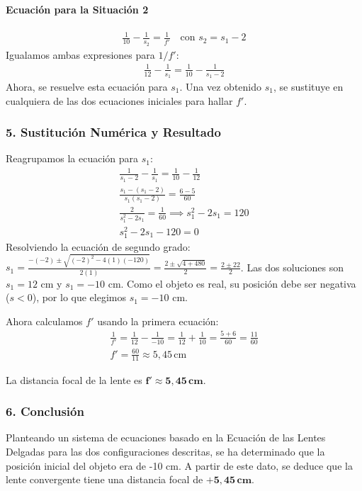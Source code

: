 \paragraph*{Ecuación para la Situación 2}
\begin{gather}
    \frac{1}{10} - \frac{1}{s_2} = \frac{1}{f'} \quad \text{con } s_2 = s_1 - 2
\end{gather}
Igualamos ambas expresiones para $1/f'$:
\begin{gather}
    \frac{1}{12} - \frac{1}{s_1} = \frac{1}{10} - \frac{1}{s_1 - 2}
\end{gather}
Ahora, se resuelve esta ecuación para $s_1$. Una vez obtenido $s_1$, se sustituye en cualquiera de las dos ecuaciones iniciales para hallar $f'$.

\subsubsection*{5. Sustitución Numérica y Resultado}
Reagrupamos la ecuación para $s_1$:
\begin{gather}
    \frac{1}{s_1 - 2} - \frac{1}{s_1} = \frac{1}{10} - \frac{1}{12} \nonumber \\[8pt]
    \frac{s_1 - (s_1 - 2)}{s_1(s_1 - 2)} = \frac{6 - 5}{60} \nonumber \\[8pt]
    \frac{2}{s_1^2 - 2s_1} = \frac{1}{60} \implies s_1^2 - 2s_1 = 120 \nonumber \\[8pt]
    s_1^2 - 2s_1 - 120 = 0
\end{gather}
Resolviendo la ecuación de segundo grado:
$s_1 = \frac{-(-2) \pm \sqrt{(-2)^2 - 4(1)(-120)}}{2(1)} = \frac{2 \pm \sqrt{4 + 480}}{2} = \frac{2 \pm 22}{2}$.
Las dos soluciones son $s_1 = 12$ cm y $s_1 = -10$ cm. Como el objeto es real, su posición debe ser negativa ($s<0$), por lo que elegimos $s_1 = -10$ cm.

Ahora calculamos $f'$ usando la primera ecuación:
\begin{gather}
    \frac{1}{f'} = \frac{1}{12} - \frac{1}{-10} = \frac{1}{12} + \frac{1}{10} = \frac{5+6}{60} = \frac{11}{60} \nonumber \\[8pt]
    f' = \frac{60}{11} \approx 5,45 \, \text{cm}
\end{gather}
\begin{cajaresultado}
    La distancia focal de la lente es $\boldsymbol{f' \approx 5,45 \, \textbf{cm}}$.
\end{cajaresultado}

\subsubsection*{6. Conclusión}
\begin{cajaconclusion}
    Planteando un sistema de ecuaciones basado en la Ecuación de las Lentes Delgadas para las dos configuraciones descritas, se ha determinado que la posición inicial del objeto era de -10 cm. A partir de este dato, se deduce que la lente convergente tiene una distancia focal de $\mathbf{+5,45 \, cm}$.
\end{cajaconclusion}

